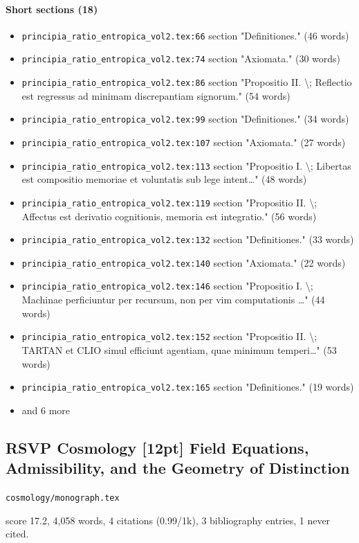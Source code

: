 \documentclass[11pt]{article}
\newcommand{\loc}[1]{{\small\color{muted}\texttt{#1}}}
\begin{document}
\paragraph{Short sections (18)}
\begin{itemize}
\item \loc{principia\_ratio\_entropica\_vol2.tex:66} section "Definitiones." (46 words)
\item \loc{principia\_ratio\_entropica\_vol2.tex:74} section "Axiomata." (30 words)
\item \loc{principia\_ratio\_entropica\_vol2.tex:86} section "Propositio II. \textbackslash{}; Reflectio est regressus ad minimam discrepantiam signorum." (54 words)
\item \loc{principia\_ratio\_entropica\_vol2.tex:99} section "Definitiones." (34 words)
\item \loc{principia\_ratio\_entropica\_vol2.tex:107} section "Axiomata." (27 words)
\item \loc{principia\_ratio\_entropica\_vol2.tex:113} section "Propositio I. \textbackslash{}; Libertas est compositio memoriae et voluntatis sub lege intent\ldots{}" (48 words)
\item \loc{principia\_ratio\_entropica\_vol2.tex:119} section "Propositio II. \textbackslash{}; Affectus est derivatio cognitionis, memoria est integratio." (56 words)
\item \loc{principia\_ratio\_entropica\_vol2.tex:132} section "Definitiones." (33 words)
\item \loc{principia\_ratio\_entropica\_vol2.tex:140} section "Axiomata." (22 words)
\item \loc{principia\_ratio\_entropica\_vol2.tex:146} section "Propositio I. \textbackslash{}; Machinae perficiuntur per recursum, non per vim computationis \ldots{}" (44 words)
\item \loc{principia\_ratio\_entropica\_vol2.tex:152} section "Propositio II. \textbackslash{}; TARTAN et CLIO simul efficiunt agentiam, quae minimum temperi\ldots{}" (53 words)
\item \loc{principia\_ratio\_entropica\_vol2.tex:165} section "Definitiones." (19 words)
\item[] {\color{muted}\small and 6 more}
\end{itemize}
\subsection{RSVP Cosmology [12pt] Field Equations, Admissibility, and the Geometry of Distinction}
\loc{cosmology/\allowbreak{}monograph.tex}\par
score 17.2, 4,058 words, 4 citations (0.99/1k), 3 bibliography entries, 1 never cited.
\end{document}
